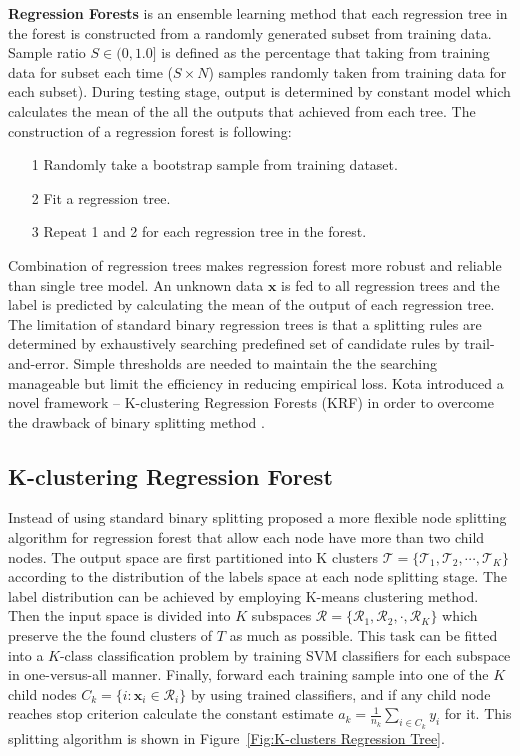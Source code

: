 \documentclass{tutmscthesis}[2010/09/22]
\numberwithin{equation}{section}
\numberwithin{table}{section}
\numberwithin{figure}{section}
\renewcommand{\vec}[1]{\bm{#1}}
\begin{document}
\textbf{Regression Forests} is an ensemble learning method that each regression tree in the forest is constructed from a randomly generated subset from training data. 
Sample ratio $S \in (0, 1.0]$ is defined as the percentage that taking from training data for subset each time ($S \times N$) samples randomly taken from training data for each subset).  
During testing stage, output is determined by constant model which calculates the mean of the all the outputs that achieved from each tree. 
The construction of a regression forest is following:

\begin{itemize}
\item[1] Randomly take a bootstrap sample from training dataset.
\item[2] Fit a regression tree. 
\item[3] Repeat 1 and 2 for each regression tree in the forest.
\end{itemize} 

 

Combination of regression trees makes regression forest more robust and reliable than single tree model. 
An unknown data $\vec{x}$ is fed to all regression trees and the label is predicted by calculating the mean of the output of each regression tree. 
The limitation of standard binary regression trees is that a splitting rules are determined by exhaustively searching predefined set of candidate rules by trail-and-error. 
Simple thresholds are needed to maintain the the searching manageable but limit the efficiency in reducing empirical loss. 
Kota \cite{hara2014growing} introduced a novel framework -- K-clustering Regression Forests (KRF) in order to overcome the drawback of binary splitting method .   

\subsection{K-clustering Regression Forest}

Instead of using standard binary splitting \cite{hara2014growing} proposed a more flexible node splitting algorithm for regression forest that allow each node have more than two child nodes.
The output space are first partitioned into K clusters $\mathcal{T} = \{\mathcal{T}_1,\mathcal{T}_2,\cdots,\mathcal{T}_K\}$ according to the distribution of the labels space at each node splitting stage. 
The label distribution can be achieved by employing K-means clustering method. 
Then the input space is divided into $K$ subspaces $\mathcal{R}=\{ \mathcal{R}_1, \mathcal{R}_2, \cdot , \mathcal{R}_K\}$ which preserve the the found clusters of $T$ as much as possible. 
This task can be fitted into a $K$-class classification problem by training SVM classifiers for each subspace in one-versus-all manner. 
Finally, forward each training sample into one of the $K$ child nodes $C_k = \{i: \vec{x}_i \in \mathcal{R}_i\}$ by using trained classifiers,  and if any child node reaches stop criterion calculate the constant estimate $a_k = \frac{1}{n_k}\sum_{i \in C_k }y_i$ for it. 
This splitting algorithm is shown in Figure~\ref{Fig:K-clusters Regression Tree}.
\end{document}
